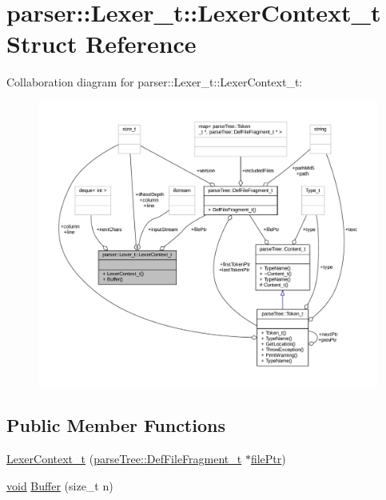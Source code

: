 \hypertarget{structparser_1_1_lexer__t_1_1_lexer_context__t}{}\section{parser\+:\+:Lexer\+\_\+t\+:\+:Lexer\+Context\+\_\+t Struct Reference}
\label{structparser_1_1_lexer__t_1_1_lexer_context__t}


Collaboration diagram for parser\+:\+:Lexer\+\_\+t\+:\+:Lexer\+Context\+\_\+t\+:
\nopagebreak
\begin{figure}[H]
\begin{center}
\leavevmode
\includegraphics[width=350pt]{structparser_1_1_lexer__t_1_1_lexer_context__t__coll__graph}
\end{center}
\end{figure}
\subsection*{Public Member Functions}
\begin{DoxyCompactItemize}
\item 
\hyperlink{structparser_1_1_lexer__t_1_1_lexer_context__t_a8725ca34eebb6818858bd180c73f364e}{Lexer\+Context\+\_\+t} (\hyperlink{structparse_tree_1_1_def_file_fragment__t}{parse\+Tree\+::\+Def\+File\+Fragment\+\_\+t} $\ast$\hyperlink{structparser_1_1_lexer__t_1_1_lexer_context__t_a15e7110763ce80683b87d236c138456c}{file\+Ptr})
\item 
\hyperlink{_t_e_m_p_l_a_t_e__cdef_8h_ac9c84fa68bbad002983e35ce3663c686}{void} \hyperlink{structparser_1_1_lexer__t_1_1_lexer_context__t_a4d8327a015cb57f3e457e7d7587cab6d}{Buffer} (size\+\_\+t n)
\end{DoxyCompactItemize}
